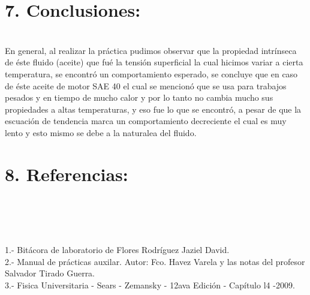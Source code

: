 \documentclass[10pt,a4paper]{article}
\begin{document}
\section*{7. Conclusiones:}\\
En general, al realizar la pr\'{a}ctica pudimos observar que la propiedad intr\'{i}nseca de \'{e}ste fluido (aceite) que fu\'{e} la tensi\'{o}n superficial la cual hicimos variar a cierta temperatura, se encontr\'{o} un comportamiento esperado, se concluye que en caso de \'{e}ste aceite de motor SAE 40 el cual se mencion\'{o} que se usa para trabajos pesados y en tiempo de mucho calor y por lo tanto  no cambia mucho sus propiedades a altas temperaturas, y eso fue lo que se encontr\'{o}, a pesar de que la escuaci\'{o}n de tendencia marca un comportamiento decreciente el cual es muy lento y esto mismo se debe a la naturalea del fluido. 
\section*{8. Referencias:}\\
\\
\medskip
\\
\\1.- Bit\'{a}cora de laboratorio de Flores Rodr\'{i}guez Jaziel David.
\\
2.- Manual de pr\'{a}cticas auxilar. Autor: Fco. Havez Varela y las notas del profesor Salvador Tirado Guerra.
\\
3.- Fisica Universitaria - Sears - Zemansky - 12ava Edici\'{o}n - Cap\'{i}tulo l4 -2009.
\end{document}
